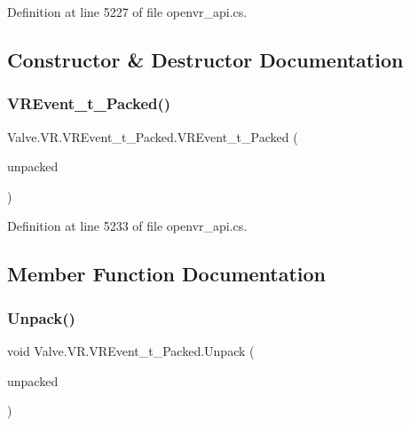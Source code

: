 Definition at line 5227 of file openvr\+\_\+api.\+cs.



\subsection{Constructor \& Destructor Documentation}
\mbox{\label{struct_valve_1_1_v_r_1_1_v_r_event__t___packed_a5974e9fe178b8e7955eead90eb9d4973}} 
\subsubsection{\texorpdfstring{VREvent\_t\_Packed()}{VREvent\_t\_Packed()}}
{\footnotesize\ttfamily Valve.\+V\+R.\+V\+R\+Event\+\_\+t\+\_\+\+Packed.\+V\+R\+Event\+\_\+t\+\_\+\+Packed (\begin{DoxyParamCaption}\item[{\mbox{\hyperlink{struct_valve_1_1_v_r_1_1_v_r_event__t}{V\+R\+Event\+\_\+t}}}]{unpacked }\end{DoxyParamCaption})}



Definition at line 5233 of file openvr\+\_\+api.\+cs.



\subsection{Member Function Documentation}
\mbox{\label{struct_valve_1_1_v_r_1_1_v_r_event__t___packed_ae6b562e86a0eb49b9e94fafa7ddf5668}} 
\subsubsection{\texorpdfstring{Unpack()}{Unpack()}}
{\footnotesize\ttfamily void Valve.\+V\+R.\+V\+R\+Event\+\_\+t\+\_\+\+Packed.\+Unpack (\begin{DoxyParamCaption}\item[{ref \mbox{\hyperlink{struct_valve_1_1_v_r_1_1_v_r_event__t}{V\+R\+Event\+\_\+t}}}]{unpacked }\end{DoxyParamCaption})}



